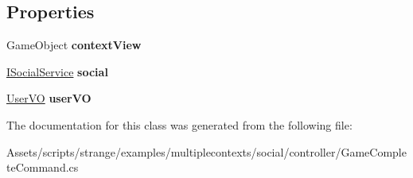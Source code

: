 \subsection*{Properties}
\begin{DoxyCompactItemize}
\item 
\hypertarget{classstrange_1_1examples_1_1multiplecontexts_1_1social_1_1_game_complete_command_ab2f70d48f7308b7565da1b8be97f818f}{Game\-Object {\bfseries context\-View}}\label{classstrange_1_1examples_1_1multiplecontexts_1_1social_1_1_game_complete_command_ab2f70d48f7308b7565da1b8be97f818f}

\item 
\hypertarget{classstrange_1_1examples_1_1multiplecontexts_1_1social_1_1_game_complete_command_acffa89e640736b102e359b4d4ae78bde}{\hyperlink{interfacestrange_1_1examples_1_1multiplecontexts_1_1social_1_1_i_social_service}{I\-Social\-Service} {\bfseries social}}\label{classstrange_1_1examples_1_1multiplecontexts_1_1social_1_1_game_complete_command_acffa89e640736b102e359b4d4ae78bde}

\item 
\hypertarget{classstrange_1_1examples_1_1multiplecontexts_1_1social_1_1_game_complete_command_a8bc0642d5533611e614141b8b806730c}{\hyperlink{classstrange_1_1examples_1_1multiplecontexts_1_1social_1_1_user_v_o}{User\-V\-O} {\bfseries user\-V\-O}}\label{classstrange_1_1examples_1_1multiplecontexts_1_1social_1_1_game_complete_command_a8bc0642d5533611e614141b8b806730c}

\end{DoxyCompactItemize}


The documentation for this class was generated from the following file\-:\begin{DoxyCompactItemize}
\item 
Assets/scripts/strange/examples/multiplecontexts/social/controller/Game\-Complete\-Command.\-cs\end{DoxyCompactItemize}
